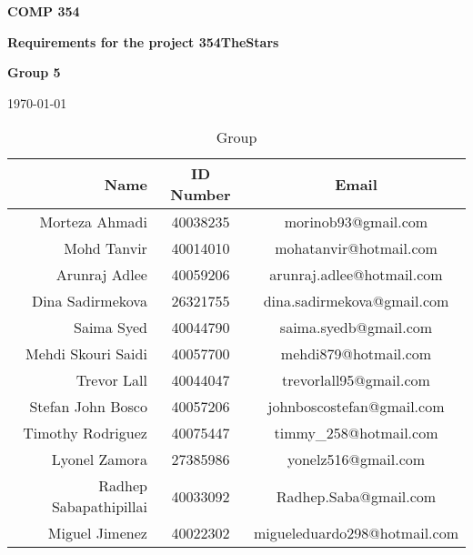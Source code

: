 \documentclass[11pt]{article}
\begin{document}
                \vspace*{0.5in}
                \centerline{\bf\Large COMP 354}
                \centerline{\bf\Large Requirements for the project 354TheStars}

                \vspace*{0.5in}
                \centerline{\bf\Large Group 5}

                \vspace*{0.5in}
                \centerline{\today}

                \begin{table}[htbp]
                    \caption{Group}
                    \begin{center}
                        \begin{tabular}{|r | c| c |}
                            \hline
                            Name & ID Number & Email \\
                            \hline
                            Morteza Ahmadi & 40038235 & morinob93@gmail.com \\
                            \hline
                            Mohd Tanvir & 40014010 & mohatanvir@hotmail.com \\
                            \hline
                            Arunraj Adlee & 40059206 & arunraj.adlee@hotmail.com \\
                            \hline
                            Dina Sadirmekova & 26321755 & dina.sadirmekova@gmail.com \\
                            \hline
                            Saima Syed & 40044790 & saima.syedb@gmail.com \\
                            \hline
                            Mehdi Skouri Saidi & 40057700 & mehdi879@hotmail.com \\
                            \hline
                            Trevor Lall & 40044047 & trevorlall95@gmail.com \\
                            \hline
                            Stefan John Bosco & 40057206 & johnboscostefan@gmail.com \\
                            \hline
                            Timothy Rodriguez & 40075447 & timmy\_258@hotmail.com \\
                            \hline
                            Lyonel Zamora & 27385986 & yonelz516@gmail.com \\
                            \hline
                            Radhep Sabapathipillai & 40033092 & Radhep.Saba@gmail.com \\
                            \hline
                            Miguel Jimenez & 40022302 & migueleduardo298@hotmail.com\\
                            \hline
                        \end{tabular}
                    \end{center}
                \end{table}
\end{document}
